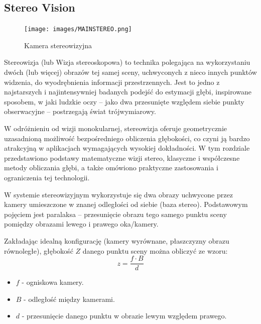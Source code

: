 \documentclass[magisterska]{pracadypl}
\begin{document}
\subsection{Stereo Vision}

\begin{figure}[H]  %
    \centering  %
    \texttt{[image: images/MAINSTEREO.png]}  %
    \captionsetup{font=footnotesize}
    \caption[Kamera stereowizyjna. https://cell-kom.com/inne/21454-kamera-internetowa-full-hd-b16-1080p-5900217390350.html]{Kamera stereowizyjna}
    \label{fig:mono}  %
\end{figure}

Stereowizja (lub Wizja stereoskopowa) to technika polegająca na wykorzystaniu dwóch (lub więcej) obrazów tej samej sceny, uchwyconych z nieco innych punktów widzenia, do wyodrębnienia informacji przestrzennych. Jest to jedno z najstarszych i najintensywniej badanych podejść do estymacji głębi, inspirowane sposobem, w jaki ludzkie oczy – jako dwa przesunięte względem siebie punkty obserwacyjne – postrzegają świat trójwymiarowy.

W odróżnieniu od wizji monokularnej, stereowizja oferuje geometrycznie uzasadnioną możliwość bezpośredniego obliczenia głębokości, co czyni ją bardzo atrakcyjną w aplikacjach wymagających wysokiej dokładności. W tym rozdziale przedstawiono podstawy matematyczne wizji stereo, klasyczne i współczesne metody obliczania głębi, a także omówiono praktyczne zastosowania i ograniczenia tej technologii.

W systemie stereowizyjnym wykorzystuje się dwa obrazy uchwycone przez kamery umieszczone w znanej odległości od siebie (baza stereo). Podstawowym pojęciem jest paralaksa – przesunięcie obrazu tego samego punktu sceny pomiędzy obrazami lewego i prawego oka/kamery.

Zakładając idealną konfigurację (kamery wyrównane, płaszczyzny obrazu równoległe), głębokość $Z$ danego punktu sceny można obliczyć ze wzoru:
\[
z = \frac{f \cdot B}{d}
\]
\begin{itemize}
  \item $f$ - ogniskowa kamery.
  \item $B$ - odległość między kamerami.
  \item $d$ - przesunięcie danego punktu w obrazie lewym względem prawego.
\end{itemize}
\end{document}
